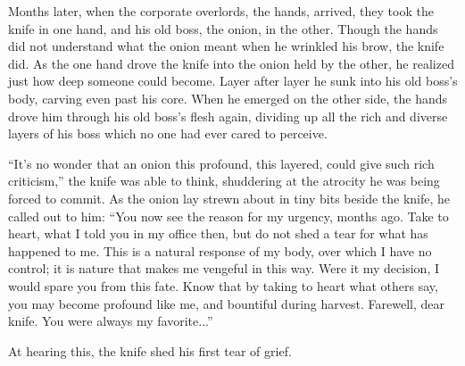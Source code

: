 \documentclass[12pt]{article}
\begin{document}
Months later, when the corporate overlords, the hands, arrived, they took the knife in one hand, and his old boss, the onion, in the other. Though the hands did not understand what the onion meant when he wrinkled his brow, the knife did. As the one hand drove the knife into the onion held by the other, he realized just how deep someone could become. Layer after layer he sunk into his old boss's body, carving even past his core. When he emerged on the other side, the hands drove him through his old boss's flesh again, dividing up all the rich and diverse layers of his boss which no one had ever cared to perceive. 

``It's no wonder that an onion this profound, this layered, could give such rich criticism,'' the knife was able to think, shuddering at the atrocity he was being forced to commit. As the onion lay strewn about in tiny bits beside the knife, he called out to him: ``You now see the reason for my urgency, months ago. Take to heart, what I told you in my office then, but do not shed a tear for what has happened to me. This is a natural response of my body, over which I have no control; it is nature that makes me vengeful in this way. Were it my decision, I would spare you from this fate. Know that by taking to heart what others say, you may become profound like me, and bountiful during harvest. Farewell, dear knife. You were always my favorite...''

At hearing this, the knife shed his first tear of grief.

%
\end{document}

